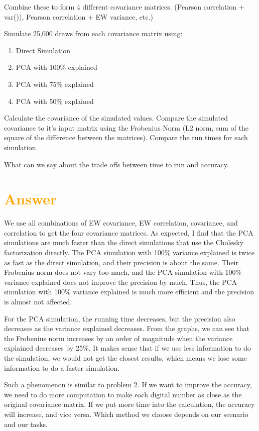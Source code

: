 \documentclass[11pt,en]{elegantpaper}
\begin{document}
Combine these to form 4 different covariance matrices. (Pearson correlation + var()), Pearson correlation + EW variance, etc.)

Simulate 25,000 draws from each covariance matrix using:
\begin{enumerate}
    \item Direct Simulation
    \item PCA with 100\% explained
    \item PCA with 75\% explained
    \item PCA with 50\% explained
\end{enumerate}

Calculate the covariance of the simulated values. Compare the simulated covariance to it's input matrix using the Frobenius Norm (L2 norm, sum of the square of the difference between the matrices). Compare the run times for each simulation.

What can we say about the trade offs between time to run and accuracy.

\section*{\textcolor{orange}{Answer}}

We use all combinations of EW covariance, EW correlation, covariance, and correlation to get the four 
covariance matrices. As expected, I find that the PCA simulations are much faster than the direct 
simulations that use the Cholesky factorization directly. The PCA simulation with 100\% variance explained 
is twice as fast as the direct simulation, and their precision is about the same. Their Frobenius 
norm does not vary too much, and the PCA simulation with 100\% variance explained does not improve 
the precision by much. Thus, the PCA simulation with 100\% variance explained is much more efficient 
and the precision is almost not affected.  

For the PCA simulation, the running time decreases, but the precision also decreases as the variance explained 
decreases. From the graphs, we can see that the Frobenius norm increases by an order of magnitude when the 
variance explained decreases by 25\%.  It makes sense that if we use less information to do the simulation, 
we would not get the closest results, which means we lose some information to do a faster simulation.    

Such a phenomenon is similar to problem 2. If we want to improve the accuracy, we need to do more computation 
to make each digital number as close as the original covariance matrix. If we put more time into the calculation,
 the accuracy will increase, and vice versa. Which method we choose depends on our scenario and our tasks.  
 
\end{document}
